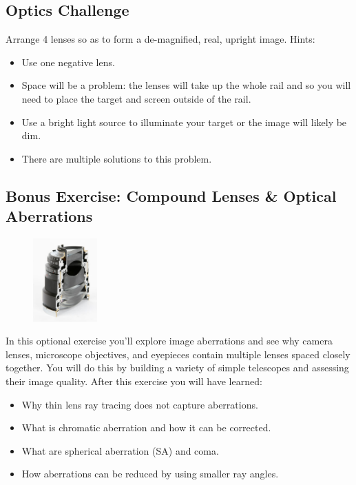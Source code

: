 \documentclass[a4paper]{report}
\begin{document}
\clearpage


\subsection{Optics Challenge}
Arrange 4 lenses so as to form a de-magnified, real, upright image. Hints: 
\begin{itemize}
\item Use one negative lens.
\item Space will be a problem: the lenses will take up the whole rail and so you will need to place the target and screen outside of the rail.
\item Use a bright light source to illuminate your target or the image will likely be dim. 
\item There are multiple solutions to this problem.
\end{itemize}

\vspace{8em}

\subsection{Bonus Exercise: Compound Lenses \& Optical Aberrations}
\begin{figure}
  \begin{center}
    \includegraphics[width=0.22\textwidth]{SLR_lens_cut_in_half.eps}

  \end{center}
  \vspace{-100pt} 
\end{figure}
In this optional exercise you'll explore image aberrations and see why camera lenses, microscope objectives, and eyepieces contain multiple lenses spaced closely together. 
You will do this by building a variety of simple telescopes and assessing their image quality.
After this exercise you will have learned:
\begin{itemize}
    \setlength\itemsep{0.15em}
    \item Why thin lens ray tracing does not capture aberrations.
    \item What is chromatic aberration and how it can be corrected.
    \item What are spherical aberration (SA) and coma.
    \item How aberrations can be reduced by using smaller ray angles.
\end{itemize}
\end{document}
